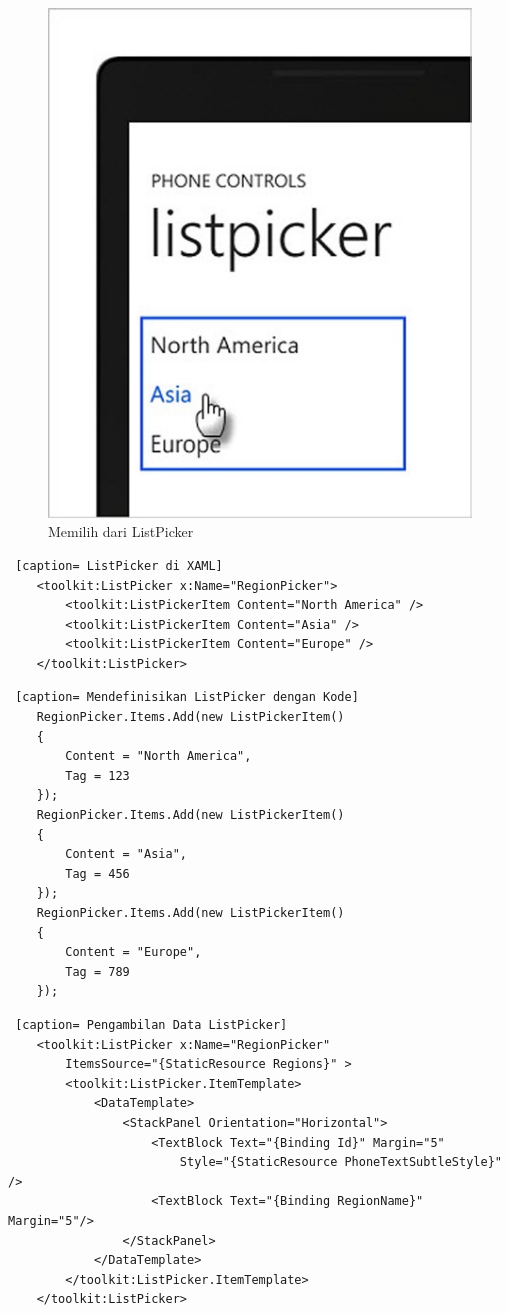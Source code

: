 \begin{figure}[h]
	\centering
		\includegraphics[scale=0.5]{Gambar/listpicker.jpg}
	\caption{Memilih dari ListPicker}
	\label{fig:listpicker}
\end{figure}

\begin{lstlisting} [caption= ListPicker di XAML]
	<toolkit:ListPicker x:Name="RegionPicker">
		<toolkit:ListPickerItem Content="North America" />
		<toolkit:ListPickerItem Content="Asia" />
		<toolkit:ListPickerItem Content="Europe" />
	</toolkit:ListPicker>
\end{lstlisting}

\begin{lstlisting} [caption= Mendefinisikan ListPicker dengan Kode]
	RegionPicker.Items.Add(new ListPickerItem()
	{
		Content = "North America",
		Tag = 123
	});
	RegionPicker.Items.Add(new ListPickerItem()
	{
		Content = "Asia",
		Tag = 456
	});
	RegionPicker.Items.Add(new ListPickerItem()
	{
		Content = "Europe",
		Tag = 789
	});
\end{lstlisting}

\begin{lstlisting} [caption= Pengambilan Data ListPicker]
	<toolkit:ListPicker x:Name="RegionPicker"
		ItemsSource="{StaticResource Regions}" >
		<toolkit:ListPicker.ItemTemplate>
			<DataTemplate>
				<StackPanel Orientation="Horizontal">
					<TextBlock Text="{Binding Id}" Margin="5"
						Style="{StaticResource PhoneTextSubtleStyle}" />
					<TextBlock Text="{Binding RegionName}" Margin="5"/>
				</StackPanel>
			</DataTemplate>
		</toolkit:ListPicker.ItemTemplate>
	</toolkit:ListPicker>
\end{lstlisting}

